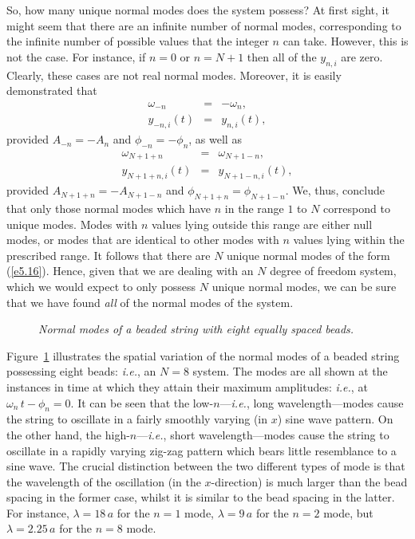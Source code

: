 So, how many unique normal modes does the system possess? At first sight, it
might seem that there are an infinite number of normal modes, corresponding to the
infinite number of possible values that the integer $n$ can take. However, this is not
the case. For instance, if $n=0$ or $n=N+1$ then all of the $y_{n,i}$ are zero.
Clearly, these cases are not real normal modes. Moreover, it is easily
demonstrated that
\begin{eqnarray}
\omega_{-n} &=&-\omega_n,\\[0.5ex]
y_{-n,i}(t) &=& y_{n,i}(t),
\end{eqnarray}
provided $A_{-n}=-A_n$ and $\phi_{-n}=-\phi_n$, as well as
\begin{eqnarray}
\omega_{N+1+n} &=&\omega_{N+1-n},\\[0.5ex]
y_{N+1+n,i}(t) &=&y_{N+1-n,i}(t),
\end{eqnarray}
provided $A_{N+1+n}=-A_{N+1-n}$ and $\phi_{N+1+n}=\phi_{N+1-n}$. We,
thus, conclude that only those normal modes which have $n$ in the
range $1$ to $N$ correspond to unique  modes. Modes with $n$ values lying outside
this range are either null modes, or modes that are identical to other  modes
with  $n$ values lying within  the prescribed range. It follows  that
there are $N$ unique normal modes of the form (\ref{e5.16}). Hence, given that we are dealing with an $N$ degree of
freedom system, which we would expect to only possess $N$ unique normal modes, we can be sure that we have found {\em all}\/ of the normal modes of the system. 

\begin{figure}
\epsfysize=7in
\centerline{}
\caption{\em Normal modes of a beaded string with eight equally spaced
beads.}\label{f5.3}   
\end{figure}

Figure~\ref{f5.3} illustrates the  spatial variation of the normal modes of a beaded string possessing eight
beads: {\em i.e.}, an $N=8$ system. The modes are all
shown at the instances in time at which they attain their maximum amplitudes: {\em i.e.},
at $\omega_n\,t-\phi_n=0$. It can be seen that the low-$n$---{\em i.e.}, long wavelength---modes cause the string to oscillate in a
fairly smoothly varying (in $x$) sine wave pattern. On the other hand, the high-$n$---{\em i.e.}, short
wavelength---modes cause the string to oscillate in a
rapidly varying zig-zag pattern which bears little resemblance to a sine wave.
The crucial distinction between the two different types of mode is that the
wavelength of the oscillation (in the $x$-direction) is much larger
than the bead spacing in the former case, whilst it is similar to
the bead spacing in the latter. For instance, $\lambda=18\,a$ for the $n=1$ mode,
$\lambda = 9\,a$ for the $n=2$ mode, but $\lambda  = 2.25\,a$ for the $n=8$ mode.

